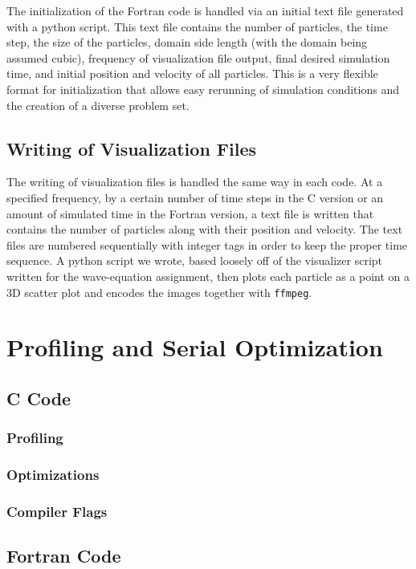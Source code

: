 \documentclass{scrartcl}
\begin{document}
    The initialization of the Fortran code is handled via an initial text file generated with a python script. This text file contains the number of particles, the time step, the size of the particles, domain side length (with the domain being assumed cubic), frequency of visualization file output, final desired simulation time, and initial position and velocity of all particles. This is a very flexible format for initialization that allows easy rerunning of simulation conditions and the creation of a diverse problem set.
    
    \subsection{Writing of Visualization Files}
    The writing of visualization files is handled the same way in each code. At a specified frequency, by a certain number of time steps in the C version or an amount of simulated time in the Fortran version, a text file is written that contains the number of particles along with their position and velocity. The text files are numbered sequentially with integer tags in order to keep the proper time sequence. A python script we wrote, based loosely off of the visualizer script written for the wave-equation assignment, then plots each particle as a point on a 3D scatter plot and encodes the images together with \texttt{ffmpeg}.
    
  \section{Profiling and Serial Optimization}  
  \subsection{C Code}

  \subsubsection{Profiling}
  
  \subsubsection{Optimizations}
  \subsubsection{Compiler Flags}
  
  \subsection{Fortran Code}
\end{document}
